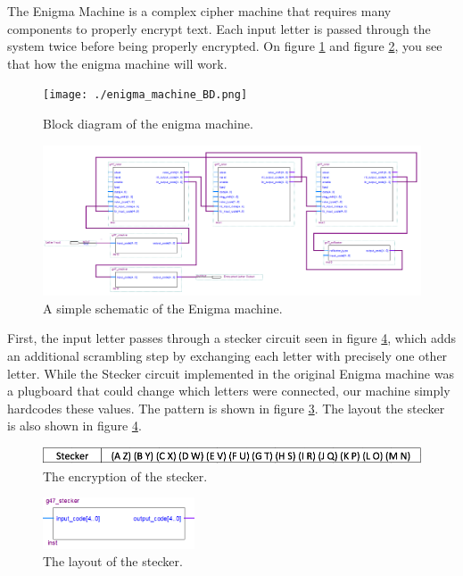 \documentclass[10pt]{article}
\begin{document}
The Enigma Machine is a complex cipher machine that requires many components to properly encrypt text. Each input letter is passed through the system twice before being properly encrypted. On figure \ref{fig:enigma_machine_BD} and figure \ref{fig:Enigma_machine_sch}, you see that how the enigma machine will work.\\
\begin{figure}[!htb]
    \centering
    \texttt{[image: ./enigma\_machine\_BD.png]}
    \caption{Block diagram of the enigma machine.}
    \label{fig:enigma_machine_BD}
\end{figure}
\begin{figure}[!htb]
    \centering
    \includegraphics[width=1\textwidth]{./Enigma_machine_sch.png}
    \caption{A simple schematic of the Enigma machine.}
    \label{fig:Enigma_machine_sch}
\end{figure}
\newline
First, the input letter passes through a stecker circuit seen in figure \ref{fig:stecker_layout}, which adds an additional scrambling step by exchanging each letter with precisely one other letter. While the Stecker circuit implemented in the original Enigma machine was a plugboard that could change which letters were connected, our machine simply hardcodes these values. The pattern is shown in figure \ref{fig:stecker_encryption}. The layout the stecker is also shown in figure \ref{fig:stecker_layout}.\\
\begin{figure}[!htb]
    \centering
    \includegraphics[width=1\textwidth]{./stecker_encryption.png}
    \caption{The encryption of the stecker.}
    \label{fig:stecker_encryption}
\end{figure}
\begin{figure}[!htb]
    \centering
    \includegraphics[width=0.4\textwidth]{./stecker_layout.png}
    \caption{The layout of the stecker.}
    \label{fig:stecker_layout}
\end{figure}
\end{document}

